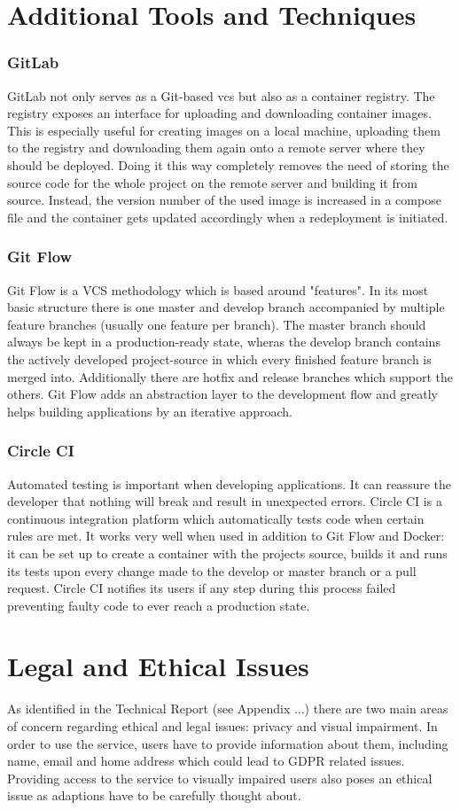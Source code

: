 \section{Additional Tools and Techniques}
\subsubsection{GitLab}
GitLab not only serves as a Git-based \acrfull{vcs} but also as a container registry. The registry exposes an interface for uploading and downloading container images. This is especially useful for creating images on a local machine, uploading them to the registry and downloading them again onto a remote server where they should be deployed. Doing it this way completely removes the need of storing the source code for the whole project on the remote server and building it from source. Instead, the version number of the used image is increased in a compose file and the container gets updated accordingly when a redeployment is initiated.

\subsubsection{Git Flow}
Git Flow is a VCS methodology which is based around "features". In its most basic structure there is one master and develop branch accompanied by multiple feature branches (usually one feature per branch). The master branch should always be kept in a production-ready state, wheras the develop branch contains the actively developed project-source in which every finished feature branch is merged into. Additionally there are hotfix and release branches which support the others. Git Flow adds an abstraction layer to the development flow and greatly helps building applications by an iterative approach.

\subsubsection{Circle CI}
Automated testing is important when developing applications. It can reassure the developer that nothing will break and result in unexpected errors. Circle CI is a continuous integration platform which automatically tests code when certain rules are met. It works very well when used in addition to Git Flow and Docker: it can be set up to create a container with the projects source, builds it and runs its tests upon every change made to the develop or master branch or a pull request. Circle CI notifies its users if any step during this process failed preventing faulty code to ever reach a production state.

\section{Legal and Ethical Issues}
As identified in the Technical Report (see Appendix ...) there are two main areas of concern regarding ethical and legal issues: privacy and visual impairment. In order to use the service, users have to provide information about them, including name, email and home address which could lead to GDPR related issues. Providing access to the service to visually impaired users also poses an ethical issue as adaptions have to be carefully thought about.